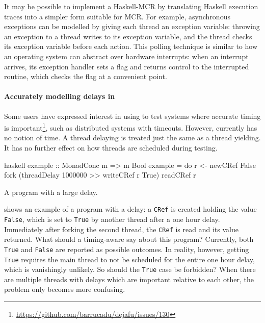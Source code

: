 It may be possible to implement a Haskell-MCR by translating Haskell
execution traces into a simpler form suitable for MCR\@.  For example,
asynchronous exceptions can be modelled by giving each thread an
exception variable: throwing an exception to a thread writes to its
exception variable, and the thread checks its exception variable
before each action.  This polling technique is similar to how an
operating system can abstract over hardware interrupts: when an
interrupt arrives, its exception handler sets a flag and returns
control to the interrupted routine, which checks the flag at a
convenient point.

\paragraph{Accurately modelling delays in \dejafu{}}
Some users have expressed interest in using \dejafu{} to test systems
where accurate timing is
important\footnote{\url{https://github.com/barrucadu/dejafu/issues/130}},
such as distributed systems with timeouts.  However, \dejafu{}
currently has no notion of time.  A thread delaying is treated just
the same as a thread yielding.  It has no further effect on how
threads are scheduled during testing.

\begin{listing}
\centering
\begin{cminted}{haskell}
example :: MonadConc m => m Bool
example = do
    r <- newCRef False
    fork (threadDelay 1000000 >> writeCRef r True)
    readCRef r
\end{cminted}
\caption{A program with a large delay.}\label{lst:unreasonable}
\end{listing}

 shows an example of a program with a delay: a
\verb|CRef| is created holding the value \verb|False|, which is set to
\verb|True| by another thread after a one hour delay.  Immediately
after forking the second thread, the \verb|CRef| is read and its value
returned.  What should a timing-aware \dejafu{} say about this
program?  Currently, both \verb|True| and \verb|False| are reported as
possible outcomes.  In reality, however, getting \verb|True| requires
the main thread to not be scheduled for the entire one hour delay,
which is vanishingly unlikely.  So should the \verb|True| case be
forbidden?  When there are multiple threads with delays which are
important relative to each other, the problem only becomes more
confusing.

